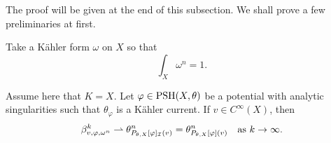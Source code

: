 The proof will be given at the end of this subsection. We shall prove a few preliminaries at first.



Take a K\"ahler form $\omega$ on $X$ so that
\[
\int_X \omega^n = 1.
\]
\begin{proposition}\label{prop:smooth_weak_conv}
    Assume here that $K=X$.
    Let $\varphi \in \mathrm{PSH}(X,\theta)$ be a potential with analytic singularities such that $\theta_{\varphi}$ is a Kähler current. If $v \in C^\infty(X)$, then
\begin{equation}\label{eq:pbmconvanaly}
\beta^k_{v,\varphi,\omega^n} \rightharpoonup \theta_{P_{\theta,X}[\varphi]_{\mathcal{I}}(v)}^n=\theta_{P_{\theta,X}[\varphi](v)}^n\quad \textup{as }k\to\infty.
\end{equation}
\end{proposition}

